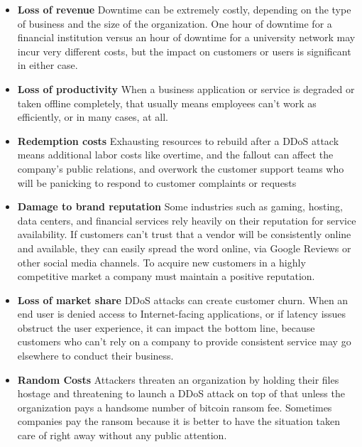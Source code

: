 \documentclass[a4paper, 12pt]{report} %
\begin{document}
                \begin{itemize}
                    \item \textbf{Loss of revenue} Downtime can be extremely costly, depending on the type of business and the size of the organization. One hour of downtime for a financial institution versus an hour of downtime for a university network may incur very different costs, but the impact on customers or users is significant in either case. 

                    \item \textbf{Loss of productivity}  When a business application or service is degraded or taken offline completely, that usually means employees can’t work as efficiently, or in many cases, at all. 

                    \item \textbf{Redemption costs} Exhausting resources to rebuild after a DDoS attack means additional labor costs like overtime, and the fallout can affect the company’s public relations, and overwork the customer support teams who will be panicking to respond to customer complaints or requests


                    \item \textbf{Damage to brand reputation}  Some industries such as gaming, hosting, data centers, and financial services rely heavily on their reputation for service availability. If customers can’t trust that a vendor will be consistently online and available, they can easily spread the word online, via Google Reviews or other social media channels. To acquire new customers in a highly competitive market a company must maintain a positive reputation.
                    \item \textbf{Loss of market share}  DDoS attacks can create customer churn. When an end user is denied access to Internet-facing applications, or if latency issues obstruct the user experience, it can impact the bottom line, because customers who can’t rely on a company to provide consistent service may go elsewhere to conduct their business.

                    \item \textbf{Random Costs}  Attackers threaten an organization by holding their files hostage and threatening to launch a DDoS attack on top of that unless the organization pays a handsome number of bitcoin ransom fee. Sometimes companies pay the ransom because it is better to have the situation taken care of right away without any public attention.

                \end{itemize}
                
\end{document}

